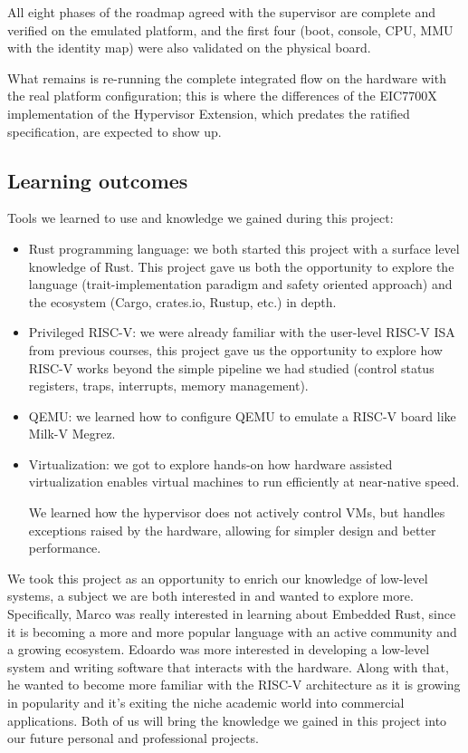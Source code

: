 \documentclass[10pt,a4]{article}
\begin{document}
All eight phases of the roadmap agreed with the supervisor are complete and
verified on the emulated platform, and the first four (boot, console, CPU,
MMU with the identity map) were also validated on the physical board.

What remains is re-running the complete integrated flow on the hardware with the real
platform configuration; this is where the differences of the EIC7700X
implementation of the Hypervisor Extension, which predates the ratified
specification, are expected to show up. 

\subsection{Learning outcomes}

Tools we learned to use and knowledge we gained during this project:
\begin{itemize} 
  \item Rust programming language: 
  we both started this project with a surface level knowledge of Rust.
  This project gave us both the opportunity to explore the language (trait-implementation paradigm
  and safety oriented approach) and the ecosystem (Cargo, crates.io, Rustup, etc.) in depth.
  \item Privileged RISC-V:
  we were already familiar with the user-level RISC-V ISA from previous courses, this project 
  gave us the opportunity to explore how RISC-V works beyond the simple pipeline we had studied
  (control status registers, traps, interrupts, memory management).
  \item QEMU: 
  we learned how to configure QEMU to emulate a RISC-V board like Milk-V Megrez.
  \item Virtualization:
  we got to explore hands-on how hardware assisted virtualization enables virtual machines
  to run efficiently at near-native speed.

  We learned how the hypervisor does not actively control VMs, but handles exceptions raised
  by the hardware, allowing for simpler design and better performance.
\end{itemize}

We took this project as an opportunity to enrich our knowledge of low-level systems,
a subject we are both interested in and wanted to explore more.
Specifically, Marco was really interested 
in learning about Embedded Rust, since it is becoming a more and more popular language
with an active community and a growing ecosystem. Edoardo was more interested in developing a low-level
system and writing software that interacts with the hardware. Along with that, he wanted to
become more familiar with the RISC-V architecture as it is growing in popularity and it's exiting
the niche academic world into commercial applications.
Both of us will bring the knowledge we gained in this project into our future personal and
professional projects.
\end{document}
